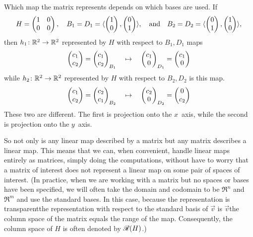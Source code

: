 \begin{example} \label{ex:CngBasesChgMap}
Which map the matrix represents depends on which bases are used.
If
\begin{equation*}
  H=
  \begin{pmatrix}
    1  &0  \\
    0  &0
  \end{pmatrix},
  \quad
  B_1=D_1=\langle\begin{pmatrix} 1 \\ 0 \end{pmatrix},\begin{pmatrix} 0 \\ 1 \end{pmatrix} \rangle,
  \quad\text{and}\quad
  B_2=D_2=\langle\begin{pmatrix} 0 \\ 1 \end{pmatrix},\begin{pmatrix} 1 \\ 0 \end{pmatrix} \rangle,
\end{equation*}
then \( \mbox{$h_1\colon \mathbb{R}^2\to \mathbb{R}^2$} \) represented by \( H \)
with respect to \( B_1,D_1 \) maps
\begin{equation*}
  \begin{pmatrix} c_1 \\ c_2 \end{pmatrix}
  =\begin{pmatrix} c_1 \\ c_2 \end{pmatrix}_{B_1}
  \quad
  \mapsto
  \quad
  \begin{pmatrix} c_1 \\ 0 \end{pmatrix}_{D_1}
  =
  \begin{pmatrix} c_1 \\ 0 \end{pmatrix}
\end{equation*}
while \( \mbox{$h_2\colon \mathbb{R}^2\to \mathbb{R}^2$} \) represented by \( H \)
with respect to \( B_2,D_2 \) is this map.
\begin{equation*}
  \begin{pmatrix} c_1 \\ c_2 \end{pmatrix}
  =\begin{pmatrix} c_2 \\ c_1 \end{pmatrix}_{B_2}
  \quad
  \mapsto
  \quad
  \begin{pmatrix} c_2 \\ 0 \end{pmatrix}_{D_2}
  =
  \begin{pmatrix} 0 \\ c_2 \end{pmatrix}
\end{equation*}
These two are different.
The first is projection onto the \( x \)~axis, while the second 
is projection onto the $y$~axis.
\end{example}

So not only is any linear map described by a
matrix but any matrix describes a linear map.
This means that we can, when convenient, 
handle linear maps entirely as matrices,
simply doing the computations, without
have to worry that a matrix of interest does not represent 
a linear map on some pair of spaces of interest.
(In practice, when we are working with a matrix but no spaces or bases have
been specified, we will often take the
domain and codomain to be $\Re^n$ and $\Re^m$ and use the standard
bases.
In this case, because the
representation is transparent\Dash the representation with respect to the
standard basis of $\vec{v}$ is $\vec{v}$\Dash the
column space of the matrix equals the range of the map.
Consequently,
the column space of \( H \) is often denoted by \( \mathscr{R}(H) \).) 


